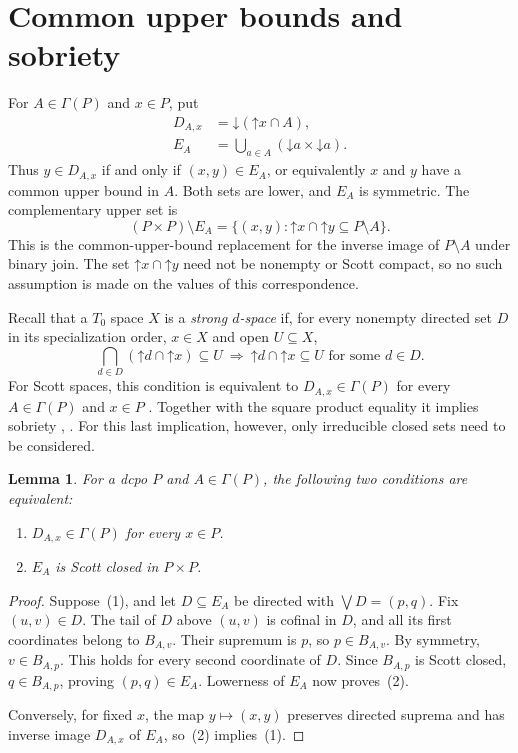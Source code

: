 \documentclass[11pt,reqno]{amsart}
\newtheorem{lemma}[theorem]{Lemma}
\theoremstyle{definition}
\theoremstyle{remark}
\numberwithin{equation}{section}
\newcommand{\down}[1]{\mathord{\downarrow}#1}
\newcommand{\up}[1]{\mathord{\uparrow}#1}
\begin{document}
\section{Common upper bounds and sobriety}\label{sec:upper-bounds}
For $A\in\Gamma(P)$ and $x\in P$, put
\begin{equation}\label{eq:upper-bound-sets}
 \begin{aligned}
 D_{A,x}&=\down(\up x\cap A),\\
 E_A&=\bigcup_{a\in A}(\down a\times\down a).
 \end{aligned}
\end{equation}
Thus $y\in D_{A,x}$ if and only if $(x,y)\in E_A$, or equivalently $x$ and $y$ have a common upper bound in $A$. Both sets are lower, and $E_A$ is symmetric. The complementary upper set is
\[
 (P\times P)\setminus E_A
 =\{(x,y):\up x\cap\up y\subseteq P\setminus A\}.
\]
This is the common-upper-bound replacement for the inverse image of $P\setminus A$ under binary join. The set $\up x\cap\up y$ need not be nonempty or Scott compact, so no such assumption is made on the values of this correspondence.

Recall that a $T_0$ space $X$ is a \emph{strong $d$-space} if, for every nonempty directed set $D$ in its specialization order, $x\in X$ and open $U\subseteq X$,
\[
 \bigcap_{d\in D}(\up d\cap\up x)\subseteq U
 ~\Longrightarrow~
 \up d\cap\up x\subseteq U\text{ for some }d\in D.
\]
For Scott spaces, this condition is equivalent to $D_{A,x}\in\Gamma(P)$ for every $A\in\Gamma(P)$ and $x\in P$ \cite[Theorem~61]{LawsonXuLower}. Together with the square product equality it implies sobriety \cite[Theorem~5.11]{LawsonXu}, \cite[Theorem~76]{LawsonXuLower}. For this last implication, however, only irreducible closed sets need to be considered.

\begin{lemma}\label{lem:upper-bound-sections}
For a dcpo $P$ and $A\in\Gamma(P)$, the following two conditions are equivalent:
\begin{enumerate}[label=\textup{(\arabic*)}]
\item $D_{A,x}\in\Gamma(P)$ for every $x\in P$.
\item $E_A$ is Scott closed in $P\times P$.
\end{enumerate}
\end{lemma}
\begin{proof}
Suppose~(1), and let $D\subseteq E_A$ be directed with $\bigvee D=(p,q)$. Fix $(u,v)\in D$. The tail of $D$ above $(u,v)$ is cofinal in $D$, and all its first coordinates belong to $B_{A,v}$. Their supremum is $p$, so $p\in B_{A,v}$. By symmetry, $v\in B_{A,p}$. This holds for every second coordinate of $D$. Since $B_{A,p}$ is Scott closed, $q\in B_{A,p}$, proving $(p,q)\in E_A$. Lowerness of $E_A$ now proves~(2).

Conversely, for fixed $x$, the map $y\mapsto(x,y)$ preserves directed suprema and has inverse image $D_{A,x}$ of $E_A$, so~(2) implies~(1).
\end{proof}
\end{document}
